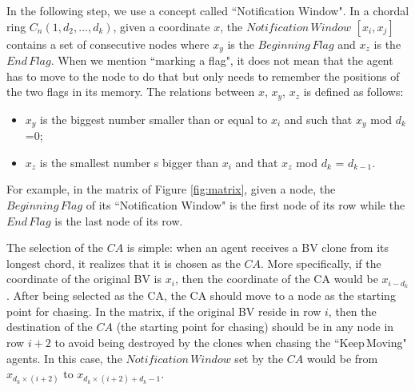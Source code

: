 In the following step, we   use a concept called ``Notification Window". In a chordal ring $C_n(1, d_2, \ldots, d_k)$, given a coordinate $x$, the $Notification\,Window$ $[x_{i},x_{j}]$   contains  a set of consecutive nodes where   $x_{y}$ is   the $Beginning\,Flag$ and   $x_{z}$ is   the $End\,Flag$. When we mention ``marking a flag", it does not mean that the agent has to move to the node to do that but only needs to remember the positions of the two flags in its memory.
The relations between $x$, $x_{y}$, $x_{z}$ is defined   as follows: 
\begin{itemize}
\item $x_{y}$ is the biggest number   smaller than or equal to $x_i$ and  such that   $x_{y}$ mod $d_k$ =$0$; 
\item $x_{z}$ is the smallest number s bigger than $x_i$ and that $x_{z}$ mod $d_k$ = $d_{k-1}$.
\end{itemize} 

For example, in the matrix of  Figure \ref{fig:matrix}, given a node, the $Beginning\,Flag$ of its ``Notification Window" is the first node of its row while the $End\,Flag$ is the last node of its row.

The selection of the $CA$ is simple: when an agent receives a BV clone from its longest chord,   it realizes that it is chosen as the $CA$. More specifically, if the coordinate of the original BV is $x_i$, then the coordinate of the CA would be $x_{i-d_k}$.
After being selected as the CA, the CA should move to a node as the starting point for chasing. In the matrix, if the original BV reside in row $i$, then the destination of the $CA$ (the starting point for chasing) should be in any node in row $i+2$ to avoid being destroyed by the clones when chasing the ``Keep\,Moving" agents. In this case, the $Notification\,Window$ set by the $CA$ would be from $x_{d_k\times(i+2)}$ to $x_{d_k\times(i+2) + d_{k}-1}$.


